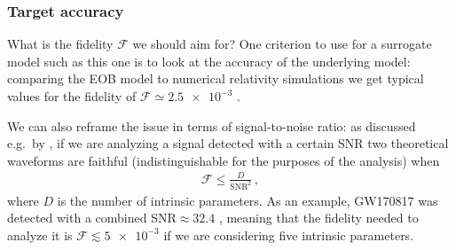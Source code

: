 \documentclass[main.tex]{subfiles}
\begin{document}
\subsubsection{Target accuracy}

What is the fidelity \(\mathcal{F}\) we should aim for? 
One criterion to use for a surrogate model such as this one is to look at the accuracy of the underlying model: comparing the \ac{EOB} model to numerical relativity simulations we get typical values for the fidelity of \(\mathcal{F} \simeq \num{2.5e-3}\) \cite[]{nagarTimedomainEffectiveonebodyGravitational2018}.

We can also reframe the issue in terms of signal-to-noise ratio: as discussed e.g.\ by \textcite[]{lindblomModelWaveformAccuracy2008} \cite[]{gambaFastFaithfulFrequencydomain2020}, if we are analyzing a signal detected with a certain \ac{SNR} two theoretical waveforms are faithful (indistinguishable for the purposes of the analysis) when 
%
\begin{align}
\mathcal{F} \leq \frac{D}{\text{SNR}^2}
\,,
\end{align}
%
where \(D\) is the number of intrinsic parameters. 
As an example, GW170817 was detected with a combined SNR\(\approx 32.4\) \cite[]{abbottGW170817ObservationGravitational2017}, meaning that the fidelity needed to analyze it is \(\mathcal{F} \lesssim \num{5e-3}\) if we are considering five intrinsic parameters.
\end{document}
